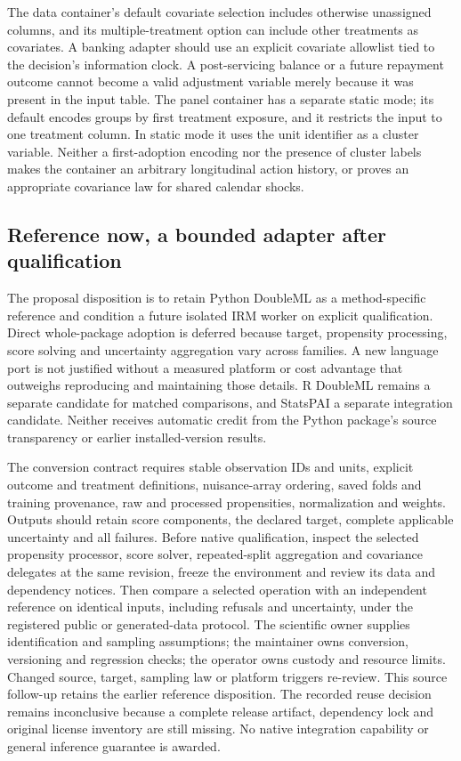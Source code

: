 The data container's default covariate selection includes otherwise unassigned
columns, and its multiple-treatment option can include other treatments as
covariates. A banking adapter should use an explicit covariate allowlist tied
to the decision's information clock. A post-servicing balance or a future
repayment outcome cannot become a valid adjustment variable merely because
it was present in the input table. The panel container has a separate static
mode; its default encodes groups by first treatment exposure, and it restricts
the input to one treatment column. In static mode it uses the unit identifier
as a cluster variable. Neither a first-adoption encoding nor the presence of
cluster labels makes the container an arbitrary longitudinal action history,
or proves an appropriate covariance law for shared calendar shocks.
\citep{exec23_doubleml_reuse_source}

\subsection{Reference now, a bounded adapter after qualification}
\label{exec23:doubleml-reuse-decision}
The proposal disposition is to retain Python DoubleML as a method-specific
reference and condition a future isolated IRM worker on explicit qualification.
Direct whole-package adoption is deferred because target, propensity processing,
score solving and uncertainty aggregation vary across families. A new language
port is not justified without a measured platform or cost advantage that
outweighs reproducing and maintaining those details. R DoubleML remains a
separate candidate for matched comparisons, and StatsPAI a separate integration
candidate. Neither receives automatic credit from the Python package's
source transparency or earlier installed-version results.
\citep{exec23_doubleml_reuse_source}

The conversion contract requires stable observation IDs and units, explicit
outcome and treatment definitions, nuisance-array ordering, saved folds and
training provenance, raw and processed propensities, normalization and weights.
Outputs should retain score components, the declared target, complete applicable
uncertainty and all failures. Before native qualification, inspect the selected
propensity processor, score solver, repeated-split aggregation and covariance
delegates at the same revision, freeze the environment and review its data and
dependency notices. Then compare a selected operation with an independent
reference on identical inputs, including refusals and uncertainty, under the
registered public or generated-data protocol. The scientific owner supplies
identification and sampling assumptions; the maintainer owns conversion,
versioning and regression checks; the operator owns custody and resource limits.
Changed source, target, sampling law or platform triggers re-review. This
source follow-up retains the earlier reference disposition. The recorded reuse
decision remains inconclusive because a complete release artifact, dependency
lock and original license inventory are still missing. No native integration
capability or general inference guarantee is awarded.
